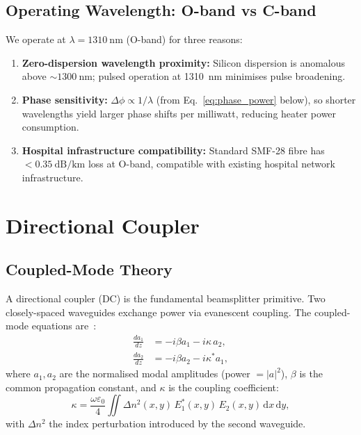 \documentclass[12pt, a4paper]{article}
\begin{document}
\subsection{Operating Wavelength: O-band vs C-band}

We operate at $\lambda = \SI{1310}{\nano\metre}$ (O-band) for three reasons:
\begin{enumerate}
  \item \textbf{Zero-dispersion wavelength proximity:}
    Silicon dispersion is anomalous above $\sim\SI{1300}{\nano\metre}$;
    pulsed operation at \SI{1310}{\nano\metre} minimises pulse broadening.
  \item \textbf{Phase sensitivity:}
    $\Delta\phi \propto 1/\lambda$ (from
    Eq.~\eqref{eq:phase_power} below), so shorter wavelengths yield larger
    phase shifts per milliwatt, reducing heater power consumption.
  \item \textbf{Hospital infrastructure compatibility:}
    Standard SMF-28 fibre has $< \SI{0.35}{\dB\per\kilo\metre}$ loss at
    O-band, compatible with existing hospital network infrastructure.
\end{enumerate}

\section{Directional Coupler}
\label{sec:dc}

\subsection{Coupled-Mode Theory}

A directional coupler (DC) is the fundamental beamsplitter primitive.
Two closely-spaced waveguides exchange power via evanescent coupling.
The coupled-mode equations are~\cite{haus1991}:
\begin{align}
  \frac{da_1}{dz} &= -i\beta a_1 - i\kappa\, a_2, \label{eq:cmt1}\\
  \frac{da_2}{dz} &= -i\beta a_2 - i\kappa^*\! a_1, \label{eq:cmt2}
\end{align}
where $a_1, a_2$ are the normalised modal amplitudes (power $= |a|^2$),
$\beta$ is the common propagation constant, and $\kappa$ is the coupling
coefficient:
\begin{equation}
  \kappa = \frac{\omega\varepsilon_0}{4} \iint \Delta n^2(x,y)\,
  E_1^*(x,y)\, E_2(x,y)\, \mathrm{d}x\,\mathrm{d}y,
  \label{eq:kappa}
\end{equation}
with $\Delta n^2$ the index perturbation introduced by the second waveguide.
\end{document}

